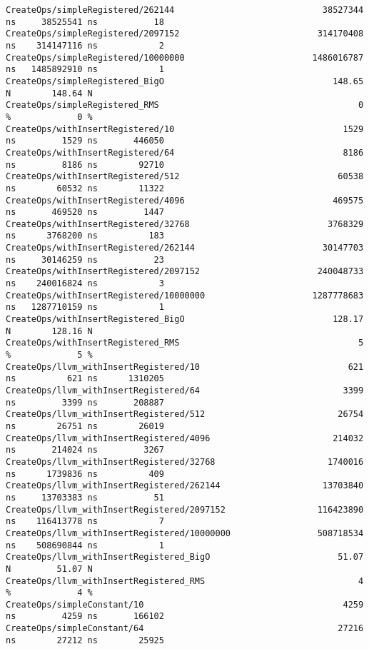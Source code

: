 \begin{code}
\begin{verbatim}
CreateOps/simpleRegistered/262144                             38527344 ns     38525541 ns           18
CreateOps/simpleRegistered/2097152                           314170408 ns    314147116 ns            2
CreateOps/simpleRegistered/10000000                         1486016787 ns   1485892910 ns            1
CreateOps/simpleRegistered_BigO                                 148.65 N        148.64 N
CreateOps/simpleRegistered_RMS                                       0 %             0 %
CreateOps/withInsertRegistered/10                                 1529 ns         1529 ns       446050
CreateOps/withInsertRegistered/64                                 8186 ns         8186 ns        92710
CreateOps/withInsertRegistered/512                               60538 ns        60532 ns        11322
CreateOps/withInsertRegistered/4096                             469575 ns       469520 ns         1447
CreateOps/withInsertRegistered/32768                           3768329 ns      3768200 ns          183
CreateOps/withInsertRegistered/262144                         30147703 ns     30146259 ns           23
CreateOps/withInsertRegistered/2097152                       240048733 ns    240016824 ns            3
CreateOps/withInsertRegistered/10000000                     1287778683 ns   1287710159 ns            1
CreateOps/withInsertRegistered_BigO                             128.17 N        128.16 N
CreateOps/withInsertRegistered_RMS                                   5 %             5 %
CreateOps/llvm_withInsertRegistered/10                             621 ns          621 ns      1310205
CreateOps/llvm_withInsertRegistered/64                            3399 ns         3399 ns       208887
CreateOps/llvm_withInsertRegistered/512                          26754 ns        26751 ns        26019
CreateOps/llvm_withInsertRegistered/4096                        214032 ns       214024 ns         3267
CreateOps/llvm_withInsertRegistered/32768                      1740016 ns      1739836 ns          409
CreateOps/llvm_withInsertRegistered/262144                    13703840 ns     13703383 ns           51
CreateOps/llvm_withInsertRegistered/2097152                  116423890 ns    116413778 ns            7
CreateOps/llvm_withInsertRegistered/10000000                 508718534 ns    508690844 ns            1
CreateOps/llvm_withInsertRegistered_BigO                         51.07 N         51.07 N
CreateOps/llvm_withInsertRegistered_RMS                              4 %             4 %
CreateOps/simpleConstant/10                                       4259 ns         4259 ns       166102
CreateOps/simpleConstant/64                                      27216 ns        27212 ns        25925

\end{verbatim}
\end{code}
